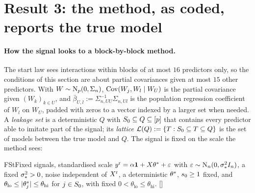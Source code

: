 \section{Result 3: the method, as coded, reports the true model}\label{sec:reported}



\paragraph{How the signal looks to a block-by-block method.} The start law sees interactions within blocks of at most
$16$ predictors only, so the conditions of this section are about partial covariances given at most $15$ other
predictors. With $W\sim\mathrm{N}_p(0,\Sigma_n)$, $\operatorname{Cov}(W_j,W_l\mid W_U)$ is the partial covariance given $(W_k)_{k\in U}$, and
$\bar\beta_{U,l}:=\Sigma_{n,UU}^{-1}\Sigma_{n,Ul}$ is the population regression coefficient of $W_l$ on $W_U$, padded
with zeros to a vector indexed by a larger set when needed. A
\emph{leakage set} is a deterministic $Q$ with $S_0\subseteq Q\subseteq[p]$ that contains every predictor able to
imitate part of the signal; its \emph{lattice} $\mathcal L(Q):=\{T:S_0\subseteq T\subseteq Q\}$ is the set of models between the
true model and $Q$. The signal is fixed on the scale the method sees:

\begin{assumption}{FSt}{Fixed signals, standardised scale}
$y^{\mathrm r}=\alpha\mathbf{1}+X\theta^*+\varepsilon$ with $\varepsilon\sim\mathrm{N}_n(0,\sigma_*^2I_n)$, a fixed $\sigma_*^2>0$, noise independent
of $X^{\mathrm r}$, a deterministic $\theta^*$, $s_0\ge1$ fixed, and $\theta_{\mathrm{lo}}\le\lvert \theta^*_j\rvert\le\theta_{\mathrm{hi}}$ for
$j\in S_0$, with fixed $0<\theta_{\mathrm{lo}}\le\theta_{\mathrm{hi}}$. \hfill []
\end{assumption}

